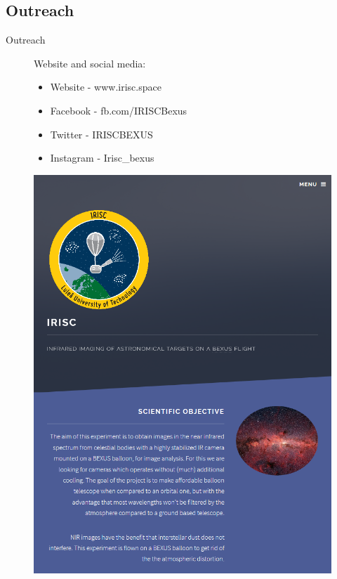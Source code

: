 \documentclass[11pt, aspectratio=169]{beamer}
\begin{document}
\subsection{Outreach} 			%
\begin{frame}{Outreach}
\begin{figure}[!htb]
    \centering
    \begin{minipage}{0.5\textwidth}
    Website and social media:
    	\begin{itemize}
    		\item Website - www.irisc.space
    		\item Facebook - fb.com/IRISCBexus
    		\item Twitter - IRISCBEXUS
    		\item Instagram - Irisc\_bexus
    	\end{itemize}
    \end{minipage}%
    \begin{minipage}{.5\textwidth}
        \centering
        \includegraphics[width=0.9\linewidth]{figures/images/website.png}
    \end{minipage}%
\end{figure}
\end{frame}
\end{document}
